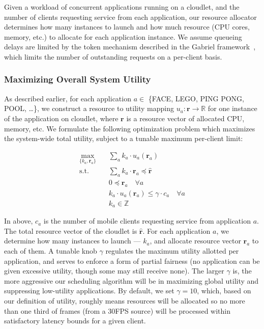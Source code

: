 Given a workload of concurrent applications running on a cloudlet, and
the number of clients requesting service from each application, our
resource allocator determines how many instances to launch and how
much resource (CPU cores, memory, etc.) to allocate for each
application instance.  We assume queueing delays are limited by the
token mechanism described in the Gabriel framework~\cite{ha2014towards},
which limits the number of outstanding requests on a per-client basis.


\subsubsection{Maximizing Overall System Utility}

As described earlier, for each application $a \in $ \{FACE, LEGO, PING PONG, POOL, \ldots \}, 
we construct a resource to utility mapping
$u_a: \mathbf{r} \rightarrow \mathbb{R}$ for one instance of the application on cloudlet, 
where $\mathbf{r}$ is a resource vector of allocated CPU, memory, etc. We formulate the 
following optimization problem which maximizes the system-wide total utility,
subject to a tunable maximum per-client limit:

\begin{equation}
  \begin{aligned}
  \max_{\{k_a, \mathbf{r}_a\}} \quad & \sum_a{k_a \cdot u_a(\mathbf{r}_a)} \\
  \textrm{s.t.} \quad & \sum_a k_a \cdot \mathbf{r}_a \preccurlyeq \hat{\mathbf{r}} \\
      & 0 \preccurlyeq \mathbf{r}_a  \quad \forall a \\
      & k_a \cdot u_a(\mathbf{r}_a) \le \gamma \cdot c_a \quad \forall a \\
      & k_a \in \mathbb{Z}
  \end{aligned}
  \end{equation}

In above, $c_a$ is the number of mobile clients requesting service from application $a$.
The total resource vector of the cloudlet is  $\hat{\mathbf{r}}$. 
 For each application $a$, we determine how many instances to launch --- $k_a$, and 
allocate resource vector $\mathbf{r}_a$ to each of them.
A tunable knob $\gamma$ regulates the maximum utility allotted 
per application, and serves to enforce a form of partial fairness (no application
can be given excessive utility, though some may still receive none). 
The larger $\gamma$ is, the more aggressive our scheduling algorithm
will be in maximizing global utility and
suppressing low-utility applications. 
By default, we set $\gamma=10$, which, based on our definition of
utility, roughly means resources will be allocated so 
no more than one third of frames (from a 30FPS source) 
will be processed within satisfactory latency bounds for a given
client.

